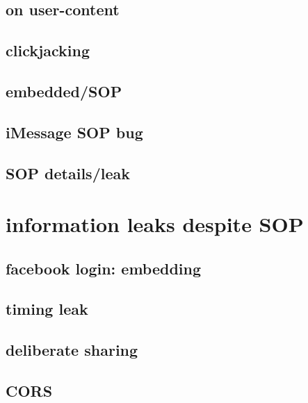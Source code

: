 \subsection{on user-content}


\subsection{clickjacking}


\subsection{embedded/SOP}


\subsection{iMessage SOP bug}


\subsection{SOP details/leak}


\section{information leaks despite SOP}

\subsection{facebook login: embedding}


\subsection{timing leak}



\subsection{deliberate sharing}


\subsection{CORS}

